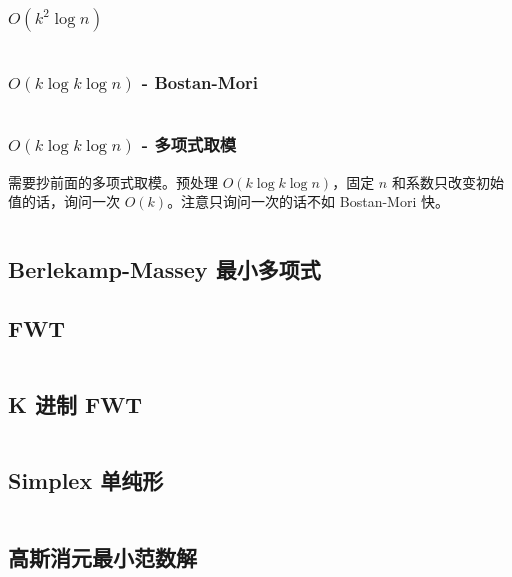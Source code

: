 \documentclass[titlepage, a4paper]{article}
\begin{document}
\begin{multicols}{2}
\begin{spacing}{0.6}
					\subsubsection*{$O(k^2 \log n)$}
						\inputminted{cpp}{src/Math/线性递推.cpp}
					\subsubsection*{$O(k \log k \log n)$ - Bostan-Mori}
						\inputminted{cpp}{src/Math/快速线性递推-bostan-mori.cpp}
					\subsubsection*{$O(k \log k \log n)$ - 多项式取模}
						需要抄前面的多项式取模。预处理 $O(k \log k \log n)$，固定 $n$ 和系数只改变初始值的话，询问一次 $O(k)$。注意只询问一次的话不如 Bostan-Mori 快。
						\inputminted{cpp}{src/Math/快速线性递推-多项式取模.cpp}
				\subsection{Berlekamp-Massey 最小多项式}
					
				\subsection{FWT}
					\inputminted{cpp}{src/Math/FWT.cpp}
				\subsection{K 进制 FWT}
					\inputminted{cpp}{src/tbr/fwt.cpp}
				\subsection{Simplex 单纯形}
					\inputminted{cpp}{src/Math/Simplex.cpp}
				\subsection{高斯消元最小范数解}
					\inputminted{cpp}{src/Geometry/minnorm_gauss.cpp}

\end{spacing}
\end{multicols}
\end{document}
